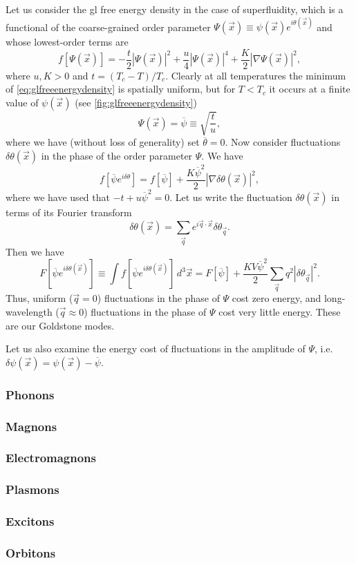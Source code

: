 Let us consider the \gls{gl} free energy density in the case of superfluidity, which is a functional of the coarse-grained order parameter $\Psi(\vec{x}) \equiv \psi(\vec{x})e^{i\theta(\vec{x})}$ and whose lowest-order terms are
\begin{equation}\label{eq:glfreeenergydensity}
f[\Psi(\vec{x})] = -\frac{t}{2}|\Psi(\vec{x})|^2+\frac{u}{4}|\Psi(\vec{x})|^4+\frac{K}{2}|\nabla \Psi(\vec{x})|^2,
\end{equation}
where $u,K>0$ and $t=(T_c-T)/T_c$.
Clearly at all temperatures the minimum of \cref{eq:glfreeenergydensity} is spatially uniform, but for $T<T_c$ it occurs at a finite value of $\psi(\vec{x})$ (see \cref{fig:glfreeenergydensity})
\begin{equation}
\Psi(\vec{x}) = \overline{\psi} \equiv \sqrt{\frac{t}{u}},
\end{equation}
where we have (without loss of generality) set $\overline{\theta} = 0$.
Now consider fluctuations $\delta \theta(\vec{x})$ in the phase of the order parameter $\Psi$.
We have
\begin{equation}
f[\overline{\psi}e^{i\delta \theta}] = f[\overline{\psi}]+\frac{K\overline{\psi}^2}{2}|\nabla \delta \theta(\vec{x})|^2,
\end{equation}
where we have used that $-t+u\overline{\psi}^2=0$.
Let us write the fluctuation $\delta \theta(\vec{x})$ in terms of its Fourier transform
\begin{equation}
\delta \theta(\vec{x}) = \sum_{\vec{q}} e^{i\vec{q}\cdot\vec{x}}\delta \theta_{\vec{q}}.
\end{equation}
Then we have
\begin{equation}
F[\overline{\psi}e^{i\delta \theta(\vec{x})}] \equiv \int f[\overline{\psi}e^{i\delta\theta(\vec{x})}] \, d^3\vec{x} = F[\overline{\psi}]+\frac{KV\overline{\psi}^2}{2}\sum_{\vec{q}} q^2|\delta \theta_{\vec{q}}|^2.
\end{equation}
Thus, uniform ($\vec{q}=0$) fluctuations in the phase of $\Psi$ cost zero energy, and long-wavelength ($\vec{q}\approx0$) fluctuations in the phase of $\Psi$ cost very little energy.
These are our Goldstone modes.

Let us also examine the energy cost of fluctuations in the amplitude of $\Psi$, i.e. $\delta \psi(\vec{x}) = \psi(\vec{x})-\overline{\psi}$.

\subsubsection{Phonons}
\subsubsection{Magnons}
\subsubsection{Electromagnons}
\subsubsection{Plasmons}
\subsubsection{Excitons}
\subsubsection{Orbitons}
